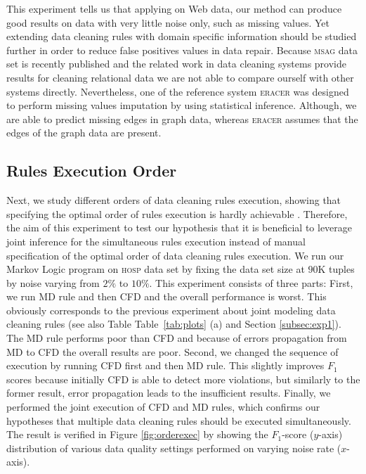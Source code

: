 This experiment tells us that applying on Web data, our method can produce good results on data with very little noise only, such as missing values. Yet extending data cleaning rules with domain specific information should be studied further in order to reduce false positives values in data repair. %
Because \textsc{msag} data set is recently published and the related work in data cleaning systems provide results for cleaning relational data we are not able to compare ourself with other systems directly. Nevertheless, one of the reference system \textsc{eracer} \cite{Mayfield:2010:EDA:1807167.1807178} was designed to perform missing values imputation by using statistical inference. Although, we are able to predict missing edges in graph data, whereas \textsc{eracer} assumes that the edges of the graph data are present.

\subsection{Rules Execution Order}
Next, we study different orders of data cleaning rules execution, showing that specifying the optimal order of rules execution is hardly achievable \cite{Dallachiesa:2013:NCD:2463676.2465327}. Therefore, the aim of this experiment to test our hypothesis that it is beneficial to leverage joint inference for the simultaneous rules execution instead of manual specification of the optimal order of data cleaning rules execution. We run our Markov Logic program on \textsc{hosp} data set by fixing the data set size at $90$K tuples by noise varying from $2\%$ to $10\%$. This experiment consists of three parts: First, we run MD rule and then CFD and the overall performance is worst. This obviously corresponds to the previous experiment about joint modeling data cleaning rules (see also Table Table~\ref{tab:plots} (a) and Section \ref{subsec:exp1}). The MD rule performs poor than CFD and because of errors propagation from MD to CFD the overall results are poor. Second, we changed the sequence of execution by running CFD first and then MD rule. This slightly improves $F_1$ scores because initially CFD is able to detect more violations, but similarly to the former result, error propagation leads to the insufficient results. Finally, we performed the joint execution of CFD and MD rules, which confirms our hypotheses that multiple data cleaning rules should be executed simultaneously. The result is verified in Figure \ref{fig:orderexec} by showing the $F_1$-score ($y$-axis) distribution of various data quality settings performed on varying noise rate ($x$-axis). 
 
